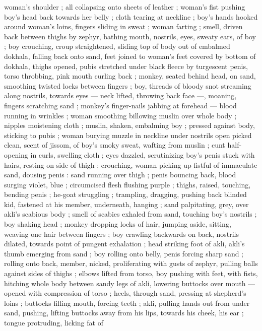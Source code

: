 woman's shoulder ; all collapsing onto sheets of leather ; woman's 
fist pushing boy's head back towards her belly ; cloth tearing at 
neckline ; boy's hands hooked around woman's loins, fingers sliding 
in sweat ; woman farting ; smell, driven back between thighs by 
zephyr, bathing mouth, nostrils, eyes, sweaty ears, of boy ; boy 
crouching, croup straightened, sliding top of body out of embalmed 
dokhala, falling back onto sand, feet joined to woman's feet covered 
by bottom of dokhala, thighs opened, pubis stretched under black 
fleece by turgescent penis, torso throbbing, pink mouth curling back 
; monkey, seated behind head, on sand, smoothing twisted locks 
between fingers ; boy, threads of bloody snot streaming along 
nostrils, towards eyes --- neck lifted, throwing back face ---, 
moaning, fingers scratching sand ; monkey's finger-nails jabbing at 
forehead --- blood running in wrinkles ; woman smoothing billowing 
muslin over whole body ; nipples moistening cloth ; muslin, shaken, 
embalming boy ; pressed against body, sticking to pubis ; woman 
burying muzzle in neckline {\col} under nostrils open picked clean, scent 
of jissom, of boy's smoky sweat, wafting from muslin ; cunt half- 
opening in curls, swelling cloth ; eyes dazzled, scrutinizing boy's 
penis stuck with hairs, resting on side of thigh ; crouching, woman 
picking up fistful of immaculate sand, dousing penis : sand running 
over thigh ; penis bouncing back, blood surging violet, blue ; 
circumcised flesh flushing purple ; thighs, raised, touching, bending 
penis ; he-goat struggling ; trampling, dragging, pushing back 
blinded kid, fastened at his member, underneath, hanging ; sand 
palpitating, grey, over akli's scabious body ; smell of scabies exhaled 
from sand, touching boy's nostrils ; boy shaking head ; monkey 
dropping locks of hair, jumping aside, sitting, weaving one hair 
between fingers ; boy crawling backwards on back, nostrils dilated, 
towards point of pungent exhalation ; head striking foot of akli, akli's 
thumb emerging from sand ; boy rolling onto belly, penis forcing 
sharp sand ; rolling onto back, member, nicked, proliferating with 
gusts of zephyr, pulling balls against sides of thighs ; elbows lifted 
from torso, boy pushing with feet, with fists, hitching whole body 
between sandy legs of akli, lowering buttocks over mouth --- opened 
with compression of torso ; heels, through sand, pressing at 
shepherd's loins ; buttocks filling mouth, forcing teeth ; akli, pulling 
hands out from under sand, pushing, lifting buttocks away from his 
lips, towards his cheek, his ear ; tongue protruding, licking fat of 
